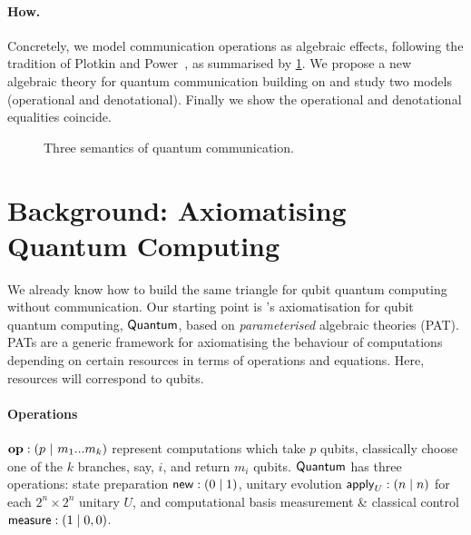 \documentclass[sigplan, nonacm]{acmart}
\begin{document}
\paragraph{How.} Concretely, we model communication operations as algebraic effects, following the tradition of Plotkin and Power~\cite{plotkin_power_2002}, as summarised by \cref{fig:triangle}. We propose a new algebraic theory for quantum communication building on \cite{statonpopl15} and study two models (operational and denotational). Finally we show the operational and denotational equalities coincide.

\begin{figure}[ht]
  \centering
  \caption{Three semantics of quantum communication.}
  \label{fig:triangle}
\end{figure}

\section{Background: Axiomatising Quantum Computing}
We already know how to build the same triangle for qubit quantum computing without communication. Our starting point is \cite{statonpopl15}'s axiomatisation for qubit quantum computing, $\mathsf{Quantum}$, based on \textit{parameterised} algebraic theories (PAT). PATs are a generic framework for axiomatising the behaviour of computations depending on certain resources in terms of operations and equations. Here, resources will correspond to qubits.

\paragraph{Operations} $\mathbf{op}: ( p \ | \ m_1...m_k)$ represent computations which take $p$ qubits, classically choose one of the $k$ branches, say, $i$, and return $m_i$ qubits. $\mathsf{Quantum}$ has three operations: state preparation $\mathsf{new}: (0 \mid 1)$, unitary evolution $\mathsf{apply}_U: (n \mid n)$ for each $2^n \times 2^n$ unitary $U$, and computational basis measurement \& classical control $\mathsf{measure}: (1 \mid 0, 0)$.
\end{document}
